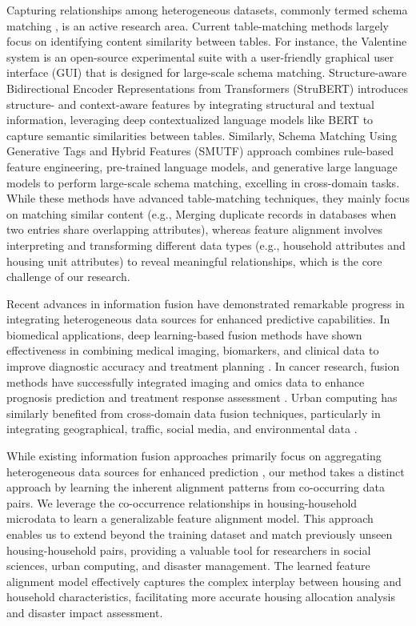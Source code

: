 \documentclass[]{nature_mod}
\begin{document}
Capturing relationships among heterogeneous datasets, commonly termed schema matching \cite{nachouki2008multi, johnston2008web}, is an active research area. Current table-matching methods largely focus on identifying content similarity between tables. For instance, the Valentine system \cite{koutras2021valentine} is an open-source experimental suite with a user-friendly graphical user interface (GUI) that is designed for large-scale schema matching. Structure-aware Bidirectional Encoder Representations from Transformers (StruBERT) \cite{trabelsi2022strubert} introduces structure- and context-aware features by integrating structural and textual information, leveraging deep contextualized language models like BERT to capture semantic similarities between tables. Similarly, Schema Matching Using Generative Tags and Hybrid Features (SMUTF) \cite{zhang2024smutf} approach combines rule-based feature engineering, pre-trained language models, and generative large language models to perform large-scale schema matching, excelling in cross-domain tasks. While these methods have advanced table-matching techniques, they mainly focus on matching similar content (e.g., Merging duplicate records in databases when two entries share overlapping attributes), whereas feature alignment involves interpreting and transforming different data types (e.g., household attributes and housing unit attributes) to reveal meaningful relationships, which is the core challenge of our research.

Recent advances in information fusion have demonstrated remarkable progress in integrating heterogeneous data sources for enhanced predictive capabilities. In biomedical applications, deep learning-based fusion methods have shown effectiveness in combining medical imaging, biomarkers, and clinical data to improve diagnostic accuracy and treatment planning \cite{zitnik2019machine, duan2024deep, zhao2024review}. In cancer research, fusion methods have successfully integrated imaging and omics data to enhance prognosis prediction and treatment response assessment \cite{lu2024privacy}.
Urban computing has similarly benefited from cross-domain data fusion techniques, particularly in integrating geographical, traffic, social media, and environmental data \cite{zou2025deep}.

While existing information fusion approaches primarily focus on aggregating heterogeneous data sources for enhanced prediction \cite{mai2023learning}, our method takes a distinct approach by learning the inherent alignment patterns from co-occurring data pairs. We leverage the co-occurrence relationships in housing-household microdata to learn a generalizable feature alignment model. This approach enables us to extend beyond the training dataset and match previously unseen housing-household pairs, providing a valuable tool for researchers in social sciences, urban computing, and disaster management. The learned feature alignment model effectively captures the complex interplay between housing and household characteristics, facilitating more accurate housing allocation analysis and disaster impact assessment.
\end{document}
